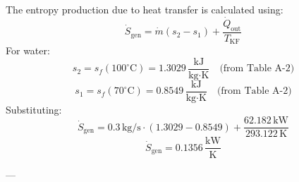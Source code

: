 The entropy production due to heat transfer is calculated using:  
\[
\dot{S}_{\text{gen}} = \dot{m} (s_2 - s_1) + \frac{\dot{Q}_{\text{out}}}{T_{\text{KF}}}
\]  
For water:  
\[
s_2 = s_f(100^\circ\text{C}) = 1.3029 \, \frac{\text{kJ}}{\text{kg·K}} \quad \text{(from Table A-2)}
\]  
\[
s_1 = s_f(70^\circ\text{C}) = 0.8549 \, \frac{\text{kJ}}{\text{kg·K}} \quad \text{(from Table A-2)}
\]  
Substituting:  
\[
\dot{S}_{\text{gen}} = 0.3 \, \text{kg/s} \cdot (1.3029 - 0.8549) + \frac{62.182 \, \text{kW}}{293.122 \, \text{K}}
\]  
\[
\dot{S}_{\text{gen}} = 0.1356 \, \frac{\text{kW}}{\text{K}}
\]  

---